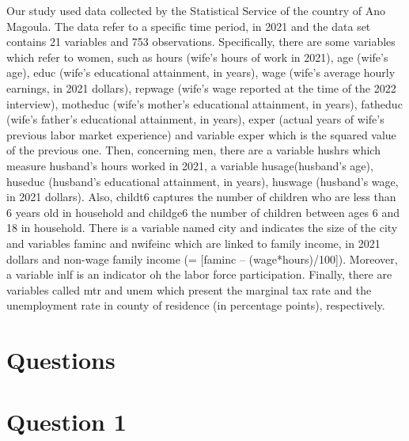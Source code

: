 \documentclass[10pt,towside,a4paper]{article}
\begin{document}
	Our study used data collected by the Statistical Service of the country of Ano Magoula. The data refer to a specific time period, in 2021 and the data set contains 21 variables and 753 observations. Specifically, there are some variables which refer to women, such as hours (wife's hours of work in 2021), age (wife's age), educ (wife's educational attainment, in years), wage (wife's average hourly earnings, in 2021 dollars), repwage (wife's wage reported at the time of the 2022 interview), motheduc (wife's mother's educational attainment, in years), fatheduc (wife's father's educational attainment, in years), exper (actual years of wife's previous labor market experience) and variable exper which is the squared value of the previous one. Then, concerning men, there are a variable hushrs which measure husband's hours worked in 2021, a variable husage(husband's age), huseduc (husband's educational attainment, in years), huswage (husband's wage, in 2021 dollars). Also, childt6 captures the number of children who are less than 6 years old in household and childge6 the number of children between ages 6 and 18 in household. There is a variable named city and indicates the size of the city and variables faminc and nwifeinc which are linked to family income, in 2021 dollars and non-wage family income (= [faminc – (wage*hours)/100]). Moreover, a variable inlf is an indicator oh the labor force participation. Finally, there are variables called mtr and unem which present the marginal tax rate and the unemployment rate in county of residence (in percentage points), respectively.
	
	
	
\section{Questions}
	
	\section*{Question 1}
	
	
	
\end{document}

